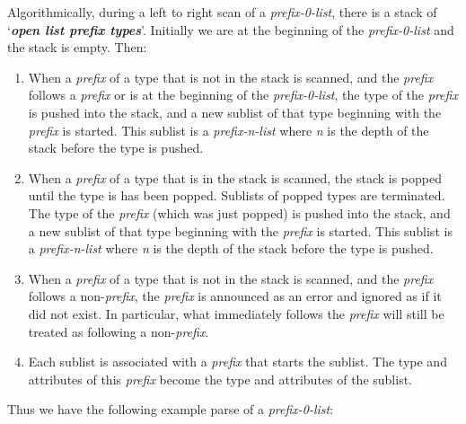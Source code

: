 \documentclass[12pt]{article}
\newcommand{\key}[1]{{\bf \em #1}\index{#1}}
\begin{document}
Algorithmically, during a left to right scan of a {\em prefix-0-list},
there is a stack of `\key{open list prefix types}'.  Initially we are
at the beginning of the {\em prefix-0-list} and the stack is empty.
Then:
\begin{enumerate}

\item
When a {\em prefix} of a type that is not in the stack is scanned,
and the {\em prefix} follows a {\em prefix} or is at the
beginning of the {\em prefix-0-list},
the type of the {\em prefix} is pushed into the stack, and a new sublist
of that type beginning with the {\em prefix} is started.
This sublist is a {\em prefix-n-list} where {\em n} is the depth of
the stack before the type is pushed.

\item
When a {\em prefix} of a type that is in the stack is scanned, the
stack is popped
until the type is has been popped.  Sublists of popped types
are terminated.
The type of the {\em prefix} (which was just popped)
is pushed into the stack, and a new sublist
of that type beginning with the {\em prefix} is started.
This sublist is a {\em prefix-n-list} where {\em n} is the depth of
the stack before the type is pushed.

\item
When a {\em prefix} of a type that is not in the stack is scanned,
and the {\em prefix} follows a non-{\em prefix},
the {\em prefix} is announced as an error and ignored as if it
did not exist.  In particular, what immediately follows the {\em prefix}
will still be treated as following a non-{\em prefix}.

\item
Each sublist is associated with a {\em prefix} that starts the
sublist.  The type and attributes of this {\em prefix} become the
type and attributes of the sublist.

\end{enumerate}


Thus we have the following example parse of a {\em prefix-0-list}:
\end{document}
